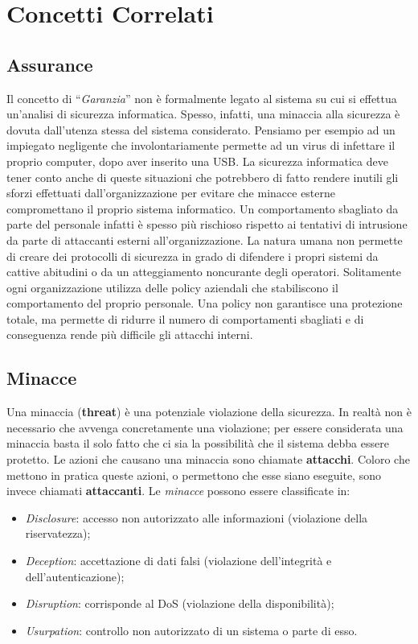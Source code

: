 \section{Concetti Correlati}

\subsection{Assurance}

Il concetto di ``\textit{Garanzia}'' non è formalmente legato al sistema su cui si
effettua un'analisi di sicurezza informatica. Spesso, infatti, una minaccia
alla sicurezza è dovuta dall'utenza stessa del sistema considerato.
Pensiamo per esempio ad un impiegato negligente che involontariamente permette ad
un virus di infettare il proprio computer, dopo aver inserito una USB.
La sicurezza informatica deve tener conto anche di queste situazioni che
potrebbero di fatto rendere inutili gli sforzi effettuati dall'organizzazione
per evitare che minacce esterne compromettano il proprio sistema informatico.
Un comportamento sbagliato da parte del personale infatti è spesso più rischioso
rispetto ai tentativi di intrusione da parte di attaccanti esterni all'organizzazione.
La natura umana non permette di creare dei protocolli di sicurezza in grado di
difendere i propri sistemi da cattive abitudini o da un atteggiamento noncurante
degli operatori. Solitamente ogni organizzazione utilizza delle policy aziendali
che stabiliscono il comportamento del proprio personale. Una policy non
garantisce una protezione totale, ma permette di ridurre il numero di comportamenti
sbagliati e di conseguenza rende più difficile gli attacchi interni.

\subsection{Minacce}

Una minaccia (\textbf{threat}) è una potenziale violazione della sicurezza.
In realtà non è necessario che avvenga concretamente una violazione; per essere
considerata una minaccia basta il solo fatto che ci sia la possibilità che
il sistema debba essere protetto.
Le azioni che causano una minaccia sono chiamate \textbf{attacchi}. Coloro che
mettono in pratica queste azioni, o permettono che esse siano eseguite, sono
invece chiamati \textbf{attaccanti}.
Le \textit{minacce} possono essere classificate in:

\begin{itemize}
      \item \textit{Disclosure}: accesso non autorizzato alle informazioni
            (violazione della riservatezza);
      \item \textit{Deception}: accettazione di dati falsi
            (violazione dell'integrità e dell'autenticazione);
      \item \textit{Disruption}: corrisponde al DoS
            (violazione della disponibilità);
      \item \textit{Usurpation}: controllo non autorizzato di un sistema o parte
            di esso.
\end{itemize}

